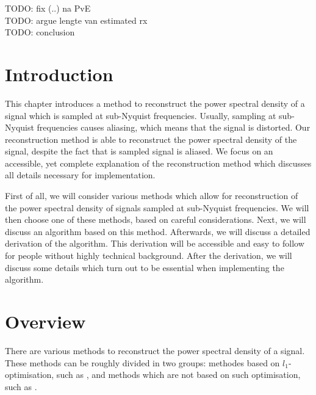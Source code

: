 \documentclass[a4paper, openany, oneside]{memoir}
\begin{document}


TODO: fix (..) na PvE \\
TODO: argue lengte van estimated rx \\
TODO: conclusion

\section{Introduction}
This chapter introduces a method to reconstruct the power spectral density of a signal which is sampled at sub-Nyquist frequencies. Usually, sampling at sub-Nyquist frequencies causes aliasing, which means that the signal is distorted. Our reconstruction method is able to reconstruct the power spectral density of the signal, despite the fact that is sampled signal is aliased. We focus on an accessible, yet complete explanation of the reconstruction method which discusses all details necessary for implementation.

First of all, we will consider various methods which allow for reconstruction of the power spectral density of signals sampled at sub-Nyquist frequencies. We will then choose one of these methods, based on careful considerations. Next, we will discuss an algorithm based on this method. Afterwards, we will discuss a detailed derivation of the algorithm. This derivation will be accessible and easy to follow for people without highly technical background. After the derivation, we will discuss some details which turn out to be essential when implementing the algorithm.

\section{Overview}
There are various methods to reconstruct the power spectral density of a signal. These methods can be roughly divided in two groups: methodes based on $l_1$-optimisation, such as \cite{bayarkernel, candes2006robust, candes2007sparsity, candes2008introduction, kirolos2006analog, li2014gomp, polo2009compressive, pal2011coprime}, and methods which are not based on such optimisation, such as \cite{ariananda2011multicoset,ariananda2012compressive}.
\end{document}
